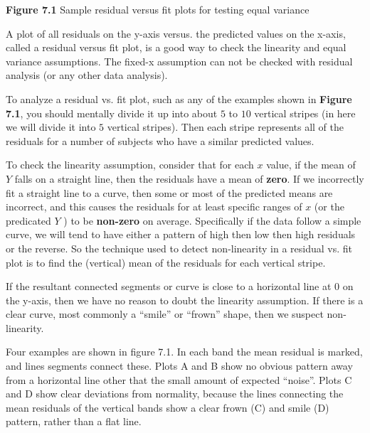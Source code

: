 \documentclass{article}
\begin{document}
\begin{multicols}{2}
\begin{center}
    \end{center}
    \end{multicols}
    
    \begin{center} 
         \textbf{Figure 7.1} Sample residual versus fit plots for testing equal variance
    \end{center}
    
    A plot of all residuals on the y-axis versus. the predicted values on the x-axis, called a residual versus fit plot, is a good way to check the linearity and equal variance assumptions. The fixed-x assumption can not be checked with residual analysis (or any other data analysis). 
    
     To analyze a residual vs. fit plot, such as any of the examples shown in \textbf{Figure 7.1}, you should mentally divide it up into about $5$ to $10$ vertical stripes (in here we will divide it into $5$ vertical stripes). Then each stripe represents all of the residuals for a number of subjects who have a similar predicted values.
     
     To check the linearity assumption, consider that for each $x$ value, if the mean of $Y$ falls on a straight line, then the residuals have a mean of \textbf{zero}. If we incorrectly fit a straight line to a curve, then some or most of the predicted means are incorrect, and this causes the residuals for at least specific ranges of $x$ (or the predicated $Y$ ) to be \textbf{non-zero} on average. Specifically if the data follow a simple curve, we will tend to have either a pattern of high then low then high residuals or the reverse. So the technique used to detect non-linearity in a residual vs. fit plot is to find the (vertical) mean of the residuals for each vertical stripe. 
     
     If the resultant connected segments or curve is close to a horizontal line at 0 on the y-axis, then we have no reason to doubt the linearity assumption. If there is a clear curve, most commonly a “smile” or “frown” shape, then we suspect non-linearity. 
     
     Four examples are shown in figure 7.1. In each band the mean residual is marked, and lines segments connect these. Plots A and B show no obvious pattern away from a horizontal line other that the small amount of expected “noise”. Plots C and D show clear deviations from normality, because the lines connecting the mean residuals of the vertical bands show a clear frown (C) and smile (D) pattern, rather than a flat line.
\end{document}

